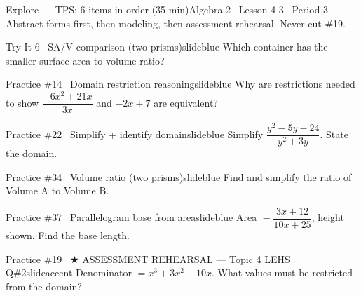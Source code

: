 \documentclass[aspectratio=169, 11pt]{beamer}
\begin{document}
\begin{frame}{Explore --- TPS: 6 items in order (35 min)}{Algebra 2 \textperiodcentered\ Lesson 4-3 \textperiodcentered\ Period 3}
\small\textcolor{slidegray}{Abstract forms first, then modeling, then assessment rehearsal. Never cut \#19.}

\vspace{0.1cm}
\begin{projcard}{Try It 6 \textperiodcentered\ SA/V comparison (two prisms)}{slideblue}
Which container has the smaller surface area-to-volume ratio?
\end{projcard}
\vspace{-0.12cm}
\begin{projcard}{Practice \#14 \textperiodcentered\ Domain restriction reasoning}{slideblue}
Why are restrictions needed to show \(\dfrac{-6x^2+21x}{3x}\) and \(-2x+7\) are equivalent?
\end{projcard}
\vspace{-0.12cm}
\begin{projcard}{Practice \#22 \textperiodcentered\ Simplify + identify domain}{slideblue}
Simplify \(\dfrac{y^2-5y-24}{y^2+3y}\). State the domain.
\end{projcard}
\vspace{-0.12cm}
\begin{projcard}{Practice \#34 \textperiodcentered\ Volume ratio (two prisms)}{slideblue}
Find and simplify the ratio of Volume A to Volume B.
\end{projcard}
\vspace{-0.12cm}
\begin{projcard}{Practice \#37 \textperiodcentered\ Parallelogram base from area}{slideblue}
Area \(= \dfrac{3x+12}{10x+25}\), height shown. Find the base length.
\end{projcard}
\vspace{-0.12cm}
\begin{projcard}{Practice \#19 \textperiodcentered\ \(\bigstar\) ASSESSMENT REHEARSAL --- Topic 4 LEHS Q\#2}{slideaccent}
Denominator \(= x^3+3x^2-10x\). What values must be restricted from the domain?
\end{projcard}
\end{frame}
\end{document}
